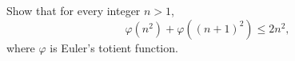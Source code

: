 Show that for every integer $n>1$,
\[
\varphi\left(n^2\right)+\varphi\left((n+1)^2\right)\le2n^2,
\]
where $\varphi$ is Euler's totient function.
